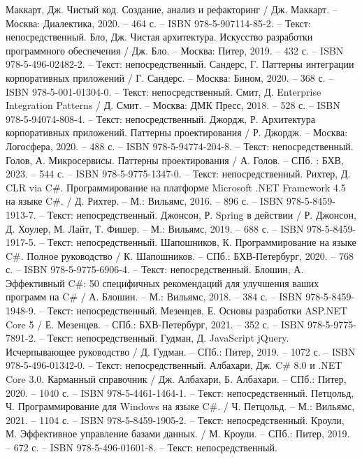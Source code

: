 \begin{thebibliography}{9}
	 Маккарт, Дж. Чистый код. Создание, анализ и рефакторинг / Дж. Маккарт. – Москва: Диалектика, 2020. – 464 с. – ISBN 978-5-907114-85-2. – Текст: непосредственный.
	 Бло, Дж. Чистая архитектура. Искусство разработки программного обеспечения / Дж. Бло. – Москва: Питер, 2019. – 432 с. – ISBN 978-5-496-02482-2. – Текст: непосредственный.
	 Сандерс, Г. Паттерны интеграции корпоративных приложений / Г. Сандерс. – Москва: Бином, 2020. – 368 с. – ISBN 978-5-001-01304-0. – Текст: непосредственный.
	 Смит, Д. Enterprise Integration Patterns / Д. Смит. – Москва: ДМК Пресс, 2018. – 528 с. – ISBN 978-5-94074-808-4. – Текст: непосредственный.
	 Джордж, Р. Архитектура корпоративных приложений. Паттерны проектирования / Р. Джордж. – Москва: Логосфера, 2020. – 488 с. – ISBN 978-5-94774-204-8. – Текст: непосредственный.
	 Голов, А. Микросервисы. Паттерны проектирования / А. Голов. – СПб. : БХВ, 2023. – 544 с. – ISBN 978-5-9775-1347-0. – Текст: непосредственный.
	 Рихтер, Д. CLR via C\#. Программирование на платформе Microsoft .NET Framework 4.5 на языке C\#. / Д. Рихтер. – М.: Вильямс, 2016. – 896 с. – ISBN 978-5-8459-1913-7. – Текст: непосредственный.
	 Джонсон, Р. Spring в действии / Р. Джонсон, Д. Хоулер, М. Лайт, Т. Фишер. – М.: Вильямс, 2019. – 688 с. – ISBN 978-5-8459-1917-5. – Текст: непосредственный.
	 Шапошников, К. Программирование на языке C\#. Полное руководство / К. Шапошников. – СПб.: БХВ-Петербург, 2020. – 768 с. – ISBN 978-5-9775-6906-4. – Текст: непосредственный.
	 Блошин, А. Эффективный C\#: 50 специфичных рекомендаций для улучшения ваших программ на C\# / А. Блошин. – М.: Вильямс, 2018. – 384 с. – ISBN 978-5-8459-1948-9. – Текст: непосредственный.
	 Мезенцев, Е. Основы разработки ASP.NET Core 5 / Е. Мезенцев. – СПб.: БХВ-Петербург, 2021. – 352 с. – ISBN 978-5-9775-7891-2. – Текст: непосредственный.
	 Гудман, Д. JavaScript jQuery. Исчерпывающее руководство / Д. Гудман. – СПб.: Питер, 2019. – 1072 с. – ISBN 978-5-496-01342-0. – Текст: непосредственный.
	 Албахари, Дж. C\# 8.0 и .NET Core 3.0. Карманный справочник / Дж. Албахари, Б. Албахари. – СПб.: Питер, 2020. – 1040 с. – ISBN 978-5-4461-1464-1. – Текст: непосредственный.
	 Петцольд, Ч. Программирование для Windows на языке C\#. / Ч. Петцольд. – М.: Вильямс, 2021. – 1104 с. – ISBN 978-5-8459-1905-2. – Текст: непосредственный.
	 Кроули, М. Эффективное управление базами данных. / М. Кроули. – СПб.: Питер, 2019. – 672 с. – ISBN 978-5-496-01601-8. – Текст: непосредственный.

\end{thebibliography}
